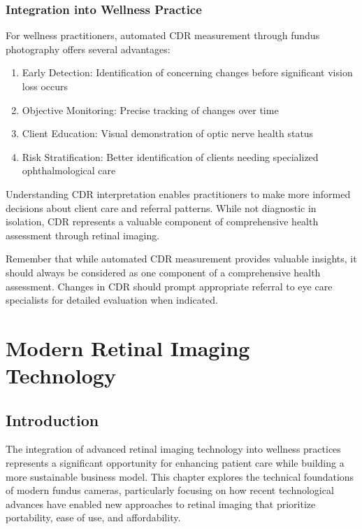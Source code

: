 \documentclass[
  Letterpaper,
]{scrbook}
\providecommand{\tightlist}{%
  \setlength{\itemsep}{0pt}\setlength{\parskip}{0pt}}\usepackage{longtable,booktabs,array}
\begin{document}
\subsection{Integration into Wellness
Practice}\label{integration-into-wellness-practice}

For wellness practitioners, automated CDR measurement through fundus
photography offers several advantages:

\begin{enumerate}
\def\labelenumi{\arabic{enumi}.}
\tightlist
\item
  Early Detection: Identification of concerning changes before
  significant vision loss occurs
\item
  Objective Monitoring: Precise tracking of changes over time
\item
  Client Education: Visual demonstration of optic nerve health status
\item
  Risk Stratification: Better identification of clients needing
  specialized ophthalmological care
\end{enumerate}

Understanding CDR interpretation enables practitioners to make more
informed decisions about client care and referral patterns. While not
diagnostic in isolation, CDR represents a valuable component of
comprehensive health assessment through retinal imaging.

Remember that while automated CDR measurement provides valuable
insights, it should always be considered as one component of a
comprehensive health assessment. Changes in CDR should prompt
appropriate referral to eye care specialists for detailed evaluation
when indicated.


\chapter{Modern Retinal Imaging
Technology}\label{modern-retinal-imaging-technology}

\section{Introduction}\label{introduction}

The integration of advanced retinal imaging technology into wellness
practices represents a significant opportunity for enhancing patient
care while building a more sustainable business model. This chapter
explores the technical foundations of modern fundus cameras,
particularly focusing on how recent technological advances have enabled
new approaches to retinal imaging that prioritize portability, ease of
use, and affordability.
\end{document}
